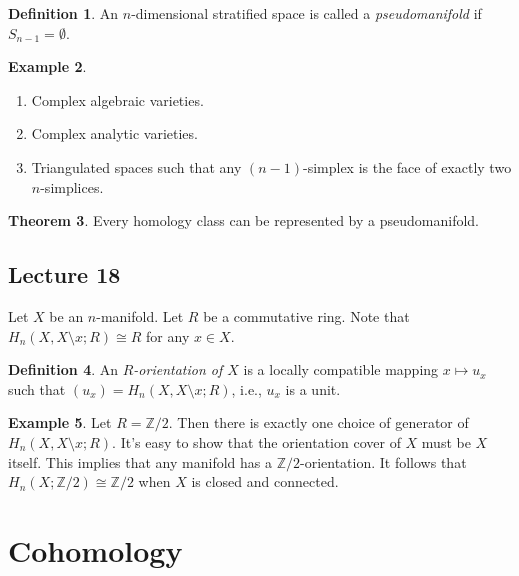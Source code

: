 \documentclass[10pt,letterpaper,cm]{nupset}
\theoremstyle{definition}
\newtheorem{definition}{Definition}[subsection]
\newtheorem{exmp}[definition]{Example}
\theoremstyle{theorem}
\newtheorem{theorem}[definition]{Theorem}
\theoremstyle{remark}
\newcommand{\Z}{\mathbb Z}
\newcommand{\1}{\mathbb{1}}
\newcommand{\0}{\vec 0}
\begin{document}
\begin{definition}
An $n$-dimensional stratified space is called a \textit{pseudomanifold} if $S_{n-1} = \emptyset$.
\end{definition}

\begin{exmp} $ $
\begin{enumerate}
\item Complex algebraic varieties.
\item Complex analytic varieties.
\item Triangulated spaces such that any $(n-1)$-simplex is the face of exactly two $n$-simplices. 
\end{enumerate}
\end{exmp}

\begin{theorem}
Every homology class can be represented by a pseudomanifold. 
\end{theorem}

\subsection{Lecture 18}

Let $X$ be an $n$-manifold. Let $R$ be a commutative ring. Note that $H_n(X, X \setminus x; R) \cong R$ for any $x\in X$.

\begin{definition}\label{RO}
  An \textit{$R$-orientation of $X$} is a locally compatible mapping $x\mapsto u_x$  such that $(u_x) = H_n(X, X \setminus x; R)$, i.e., $u_x$ is a unit.
\end{definition}

\begin{exmp}
Let $R= \Z/2$. Then there is exactly one choice of generator of $ H_n(X, X \setminus x; R)$. It's easy to show that the orientation cover of $X$ must be $X$ itself. This implies that any manifold has a $\Z/2$-orientation. It follows that $H_n(X; \Z/2) \cong \Z/2$ when $X$ is closed and connected. 
\end{exmp}

\section{Cohomology} 
\end{document}
